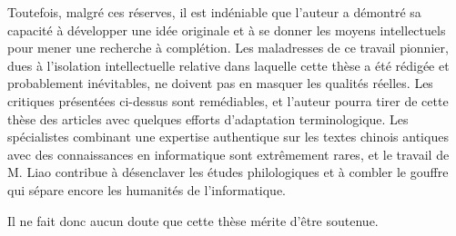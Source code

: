 \documentclass[oldfontcommands,oneside,a4paper,11pt]{article}
\begin{document}
Toutefois, malgré ces réserves, il est indéniable que l'auteur a démontré sa capacité à  développer une idée originale et  à se donner les moyens intellectuels pour mener une recherche à complétion. Les maladresses de ce travail pionnier, dues à l'isolation intellectuelle relative dans laquelle cette thèse a été rédigée et probablement inévitables, ne doivent pas en masquer les qualités réelles. Les critiques présentées ci-dessus sont remédiables, et l'auteur pourra tirer de cette thèse des articles avec quelques efforts d'adaptation terminologique. Les spécialistes combinant une expertise authentique sur les textes chinois antiques avec des connaissances en informatique sont extrêmement rares, et le travail de M. Liao  contribue à désenclaver les études philologiques et à combler le gouffre qui sépare encore les humanités de l'informatique.


Il ne fait donc aucun doute que cette thèse mérite d'être soutenue.

%
%
\end{document}
